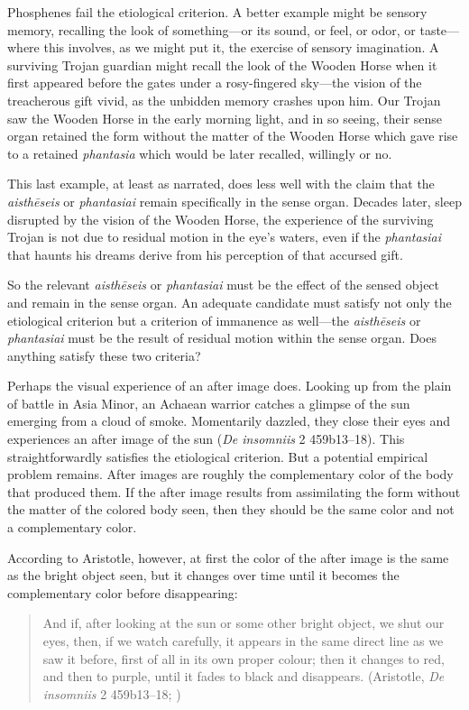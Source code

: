 Phosphenes fail the etiological criterion. A better example might be sensory memory, recalling the look of something—or its sound, or feel, or odor, or taste—where this involves, as we might put it, the exercise of sensory imagination. A surviving Trojan guardian might recall the look of the Wooden Horse when it first appeared before the gates under a rosy-fingered sky—the vision of the treacherous gift vivid, as the unbidden memory crashes upon him. Our Trojan saw the Wooden Horse in the early morning light, and in so seeing, their sense organ retained the form without the matter of the Wooden Horse which gave rise to a retained \emph{phantasia} which would be later recalled, willingly or no. 

This last example, at least as narrated, does less well with the claim that the \emph{aisthēseis} or \emph{phantasiai} remain specifically in the sense organ. Decades later, sleep disrupted by the vision of the Wooden Horse, the experience of the surviving Trojan is not due to residual motion in the eye's waters, even if the \emph{phantasiai} that haunts his dreams derive from his perception of that accursed gift.

So the relevant \emph{aisthēseis} or \emph{phantasiai} must be the effect of the sensed object and remain in the sense organ. An adequate candidate must satisfy not only the etiological criterion but a criterion of immanence as well—the \emph{aisthēseis} or \emph{phantasiai} must be the result of residual motion within the sense organ. Does anything satisfy these two criteria? 

Perhaps the visual experience of an after image does. Looking up from the plain of battle in Asia Minor, an Achaean warrior catches a glimpse of the sun emerging from a cloud of smoke. Momentarily dazzled, they close their eyes and experiences an after image of the sun (\emph{De insomniis} 2 459b13–18). This straightforwardly satisfies the etiological criterion. But a potential empirical problem remains. After images are roughly the complementary color of the body that produced them. If the after image results from assimilating the form without the matter of the colored body seen, then they should be the same color and not a complementary color. 

According to Aristotle, however, at first the color of the after image is the same as the bright object seen, but it changes over time until it becomes the complementary color before disappearing: 
\begin{quote}
	And if, after looking at the sun or some other bright object, we shut our eyes, then, if we watch carefully, it appears in the same direct line as we saw it before, first of all in its own proper colour; then it changes to red, and then to purple, until it fades to black and disappears. (Aristotle, \emph{De insomniis} 2 459b13–18; \citealt[355]{Hett:1936fk})
\end{quote}

